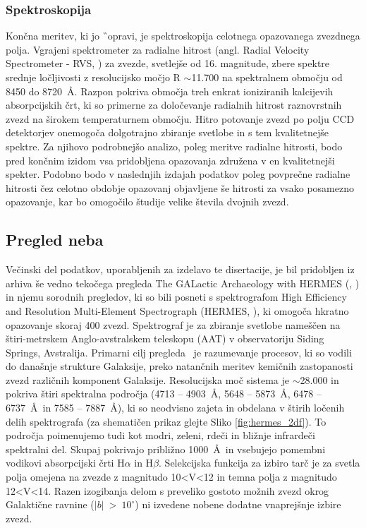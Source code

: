 \subsubsection{Spektroskopija}
Končna meritev, ki jo \G\ opravi, je spektroskopija celotnega opazovanega zvezdnega polja. Vgrajeni spektrometer za radialne hitrost (angl. Radial Velocity Spectrometer - RVS, \cite{2018A&A...616A...5C}) za zvezde, svetlejše od 16. magnitude, zbere spektre srednje ločljivosti z resolucijsko močjo R $\sim$11.700 na spektralnem območju od 8450 do 8720~\AA. Razpon pokriva območja treh enkrat ioniziranih kalcijevih absorpcijskih črt, ki so primerne za določevanje radialnih hitrost raznovrstnih zvezd na širokem temperaturnem območju. Hitro potovanje zvezd po polju CCD detektorjev onemogoča dolgotrajno zbiranje svetlobe in s tem kvalitetnejše spektre. Za njihovo podrobnejšo analizo, poleg meritve radialne hitrosti, bodo pred končnim izidom vsa pridobljena opazovanja združena v en kvalitetnejši spekter. Podobno bodo v naslednjih izdajah podatkov poleg povprečne radialne hitrosti čez celotno obdobje opazovanj objavljene še hitrosti za vsako posamezno opazovanje, kar bo omogočilo študije velike števila dvojnih zvezd.


\subsection{Pregled neba \Gh}
\label{sec:slo_galah}
Večinski del podatkov, uporabljenih za izdelavo te disertacije, je bil pridobljen iz arhiva še vedno tekočega pregleda The GALactic Archaeology with HERMES (\Gh, \cite{2015MNRAS.449.2604D}) in njemu sorodnih pregledov, ki so bili posneti s spektrografom High Efficiency and Resolution Multi-Element Spectrograph (HERMES, \cite{2010SPIE.7735E..09B, 2015JATIS...1c5002S}), ki omogoča hkratno opazovanje skoraj 400 zvezd. Spektrograf je za zbiranje svetlobe nameščen na štiri-metrskem Anglo-avstralskem teleskopu (AAT) v observatoriju Siding Springs, Avstralija. Primarni cilj pregleda \Gh\ je razumevanje procesov, ki so vodili do današnje strukture Galaksije, preko natančnih meritev kemičnih zastopanosti zvezd različnih komponent Galaksije. Resolucijska moč sistema je $\sim$28.000 in pokriva štiri spektralna področja (4713 -- 4903~\AA, 5648 -- 5873~\AA, 6478 -- 6737~\AA\ in 7585 -- 7887~\AA), ki so neodvisno zajeta in obdelana v štirih ločenih delih spektrografa (za shematičen prikaz glejte Sliko \ref{fig:hermes_2df}). To področja poimenujemo tudi kot modri, zeleni, rdeči in bližnje infrardeči spektralni del. Skupaj pokrivajo približno 1000~\AA\ in vsebujejo pomembni vodikovi absorpcijski črti H$\alpha$ in H$\beta$. Selekcijska funkcija za izbiro tarč je za svetla polja omejena na zvezde z magnitudo 10<V<12 in temna polja z magnitudo 12<V<14. Razen izogibanja delom s preveliko gostoto možnih zvezd okrog Galaktične ravnine ($|b|$~>~$10^\circ$) ni izvedene nobene dodatne vnaprejšnje izbire zvezd.

